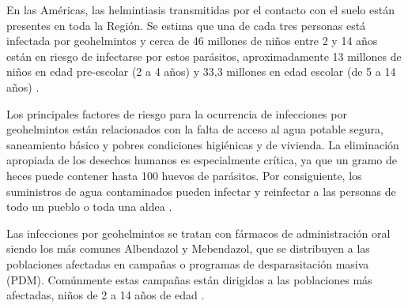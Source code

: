 \documentclass[12pt,a4paper]{article}
\theoremstyle{plain}%
\theoremstyle{definition}
\theoremstyle{remark}
\begin{document}
	En las Américas, las helmintiasis transmitidas por el contacto con el suelo están presentes en toda la Región.
	Se estima que una de cada tres personas está infectada por geohelmintos y cerca de 46 millones de niños entre 2 y 14 años están en riesgo de infectarse por estos parásitos, aproximadamente 13 millones de niños en edad pre-escolar (2 a 4 años) y 33,3 millones en edad escolar (de 5 a 14 años) \cite{paho2003,who2006preventive,who2012soil}.
	
	Los principales factores de riesgo para la ocurrencia de infecciones por geohelmintos están relacionados con la falta de acceso al agua potable segura,  saneamiento básico y pobres condiciones higiénicas y de vivienda.  La eliminación apropiada de los desechos humanos es especialmente crítica, ya que un gramo de heces puede contener hasta 100 huevos de parásitos. Por consiguiente, los suministros de agua contaminados pueden infectar y reinfectar a las personas de todo un pueblo o toda una aldea \cite{paho2003,who2006preventive,who2012soil}.
	




Las infecciones por geohelmintos se tratan con fármacos de administración oral siendo los más comunes Albendazol y Mebendazol,
   que se distribuyen a las poblaciones afectadas en campañas o programas de desparasitación masiva (PDM). Comúnmente estas campañas están dirigidas a las poblaciones más afectadas,  niños de 2 a 14 años de edad \citep{pizzi2007geohelmintiosis}. 
\end{document}
